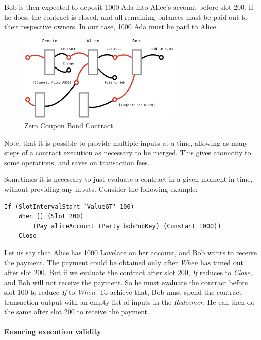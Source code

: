 \documentclass[runningheads]{llncs}
\begin{document}
\noindent
Bob is then expected to deposit 1000 Ada into Alice's account before slot 200.
If he does, the contract is closed, and all remaining balances must be paid out
to their respective owners. In our case, 1000 Ada must be paid to Alice.

\begin{figure}[!h]
    \centering
    \includegraphics[width=0.7\textwidth]{figures/Marlowe3-Figures-004.jpeg}
    \caption{Zero Coupon Bond Contract}
    \label{fig:zero-coupon-bond}
\end{figure}

Note, that it is possible to provide multiple inputs at a time,
allowing as many steps of a contract execution as necessary to be merged.
This gives atomicity to some operations, and saves on transaction fees.

Sometimes it is necessary to just evaluate a contract in a given moment in time,
without providing any inputs. Consider the following example:

\begin{verbatim}
If (SlotIntervalStart `ValueGT' 100)
    When [] (Slot 200)
        (Pay aliceAccount (Party bobPubKey) (Constant 1000))
    Close
\end{verbatim}

Let us say that Alice has 1000 Lovelace on her account, and Bob wants to receive the payment.
The payment could be obtained only after \emph{When} has timed out after slot 200.
But if we evaluate the contract after slot 200, \emph{If} reduces to \emph{Close}, and
Bob will not receive the payment. So he must evaluate the contract before slot 100 to
reduce \emph{If} to \emph{When}.
To achieve that, Bob must spend the contract transaction output with an empty list of inputs in the \emph{Redeemer}.
He can then do the same after slot 200 to receive the payment.

\paragraph{Ensuring execution validity}
\end{document}
